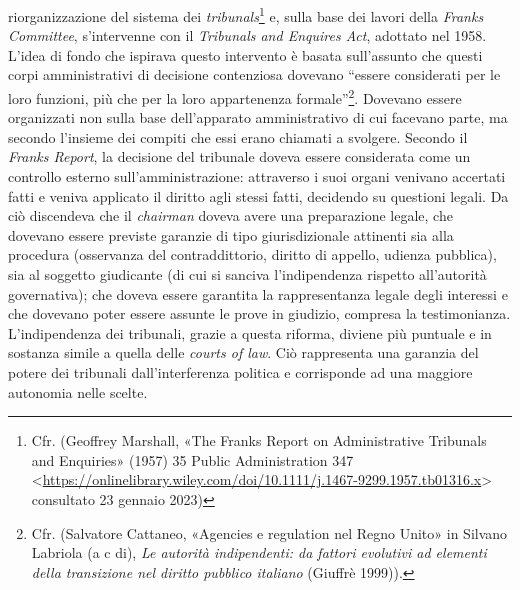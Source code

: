 \documentclass[12pt,it,a4paper,]{report}
\begin{document}
riorganizzazione del sistema dei \emph{tribunals}\footnote{Cfr.
  (Geoffrey Marshall, {«The Franks Report on Administrative Tribunals
  and Enquiries»} (1957) 35 Public Administration 347
  \textless{}\url{https://onlinelibrary.wiley.com/doi/10.1111/j.1467-9299.1957.tb01316.x}\textgreater{}
  consultato 23 gennaio 2023)} e, sulla base dei lavori della
\emph{Franks Committee}, s'intervenne con il \emph{Tribunals and
Enquires Act}, adottato nel 1958. L'idea di fondo che ispirava questo
intervento è basata sull'assunto che questi corpi amministrativi di
decisione contenziosa dovevano ``essere considerati per le loro
funzioni, più che per la loro appartenenza formale''\footnote{Cfr.
  (Salvatore Cattaneo, {«Agencies e regulation nel Regno Unito»} in
  Silvano Labriola (a c di), \emph{Le autorità indipendenti: da fattori
  evolutivi ad elementi della transizione nel diritto pubblico italiano}
  (Giuffrè 1999)).}. Dovevano essere organizzati non sulla base
dell'apparato amministrativo di cui facevano parte, ma secondo l'insieme
dei compiti che essi erano chiamati a svolgere. Secondo il \emph{Franks
Report}, la decisione del tribunale doveva essere considerata come un
controllo esterno sull'amministrazione: attraverso i suoi organi
venivano accertati fatti e veniva applicato il diritto agli stessi
fatti, decidendo su questioni legali. Da ciò discendeva che il
\emph{chairman} doveva avere una preparazione legale, che dovevano
essere previste garanzie di tipo giurisdizionale attinenti sia alla
procedura (osservanza del contraddittorio, diritto di appello, udienza
pubblica), sia al soggetto giudicante (di cui si sanciva l'indipendenza
rispetto all'autorità governativa); che doveva essere garantita la
rappresentanza legale degli interessi e che dovevano poter essere
assunte le prove in giudizio, compresa la testimonianza. L'indipendenza
dei tribunali, grazie a questa riforma, diviene più puntuale e in
sostanza simile a quella delle \emph{courts of law}. Ciò rappresenta una
garanzia del potere dei tribunali dall'interferenza politica e
corrisponde ad una maggiore autonomia nelle scelte.
\end{document}

